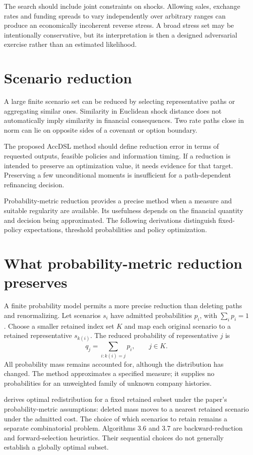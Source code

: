 The search should include joint constraints on shocks. Allowing sales, exchange rates and funding spreads to vary independently over arbitrary ranges can produce an economically incoherent reverse stress. A broad stress set may be intentionally conservative, but its interpretation is then a designed adversarial exercise rather than an estimated likelihood.

\section{Scenario reduction}
A large finite scenario set can be reduced by selecting representative paths or aggregating similar ones. Similarity in Euclidean shock distance does not automatically imply similarity in financial consequences. Two rate paths close in norm can lie on opposite sides of a covenant or option boundary.

The proposed AccDSL method should define reduction error in terms of requested outputs, feasible policies and information timing. If a reduction is intended to preserve an optimization value, it needs evidence for that target. Preserving a few unconditional moments is insufficient for a path-dependent refinancing decision.

Probability-metric reduction provides a precise method when a measure and suitable regularity are available. Its usefulness depends on the financial quantity and decision being approximated. The following derivations distinguish fixed-policy expectations, threshold probabilities and policy optimization.

\section{What probability-metric reduction preserves}
A finite probability model permits a more precise reduction than deleting paths and renormalizing. Let scenarios $s_i$ have admitted probabilities $p_i$, with $\sum_i p_i=1$. Choose a smaller retained index set $K$ and map each original scenario to a retained representative $s_{k(i)}$. The reduced probability of representative $j$ is
\begin{equation}
 q_j=\sum_{i:k(i)=j}p_i,\qquad j\in K.
\end{equation}
All probability mass remains accounted for, although the distribution has changed. The method approximates a specified measure; it supplies no probabilities for an unweighted family of unknown company histories.

\citet[Section 3, Theorem 3.1 and its proof]{dupacova2000preprint} derives optimal redistribution for a fixed retained subset under the paper's probability-metric assumptions: deleted mass moves to a nearest retained scenario under the admitted cost. The choice of which scenarios to retain remains a separate combinatorial problem. Algorithms 3.6 and 3.7 are backward-reduction and forward-selection heuristics. Their sequential choices do not generally establish a globally optimal subset.

